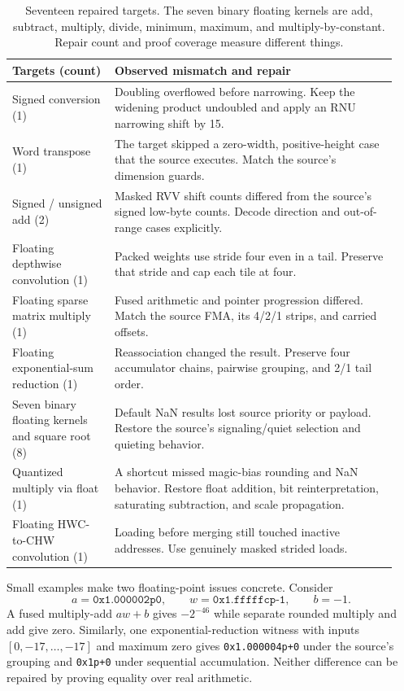 \documentclass[11pt]{article}
\begin{document}
\begin{table}[htbp]
\centering\small
\begin{tabular}{@{}p{0.25\linewidth}p{0.69\linewidth}@{}}
\toprule
Targets (count) & Observed mismatch and repair \\
\midrule
Signed conversion (1) & Doubling overflowed before narrowing. Keep the widening product undoubled and apply an RNU narrowing shift by 15. \\[5pt]
Word transpose (1) & The target skipped a zero-width, positive-height case that the source executes. Match the source's dimension guards. \\[5pt]
Signed / unsigned add (2) & Masked RVV shift counts differed from the source's signed low-byte counts. Decode direction and out-of-range cases explicitly. \\[5pt]
Floating depthwise convolution (1) & Packed weights use stride four even in a tail. Preserve that stride and cap each tile at four. \\[5pt]
Floating sparse matrix multiply (1) & Fused arithmetic and pointer progression differed. Match the source FMA, its 4/2/1 strips, and carried offsets. \\[5pt]
Floating exponential-sum reduction (1) & Reassociation changed the result. Preserve four accumulator chains, pairwise grouping, and 2/1 tail order. \\[5pt]
Seven binary floating kernels and square root (8) & Default NaN results lost source priority or payload. Restore the source's signaling/quiet selection and quieting behavior. \\[5pt]
Quantized multiply via float (1) & A shortcut missed magic-bias rounding and NaN behavior. Restore float addition, bit reinterpretation, saturating subtraction, and scale propagation. \\[5pt]
Floating HWC-to-CHW convolution (1) & Loading before merging still touched inactive addresses. Use genuinely masked strided loads. \\
\bottomrule
\end{tabular}
\caption{Seventeen repaired targets. The seven binary floating kernels are add, subtract, multiply, divide, minimum, maximum, and multiply-by-constant. Repair count and proof coverage measure different things.}
\label{tab:repairs}
\end{table}

Small examples make two floating-point issues concrete. Consider
\[ a=\texttt{0x1.000002p0},\qquad w=\texttt{0x1.fffffcp-1},\qquad b=-1. \]
A fused multiply-add $aw+b$ gives $-2^{-46}$ while separate rounded multiply and add give zero. Similarly, one exponential-reduction witness with inputs $[0,-17,\ldots,-17]$ and maximum zero gives \texttt{0x1.000004p+0} under the source's grouping and \texttt{0x1p+0} under sequential accumulation. Neither difference can be repaired by proving equality over real arithmetic.
\end{document}
